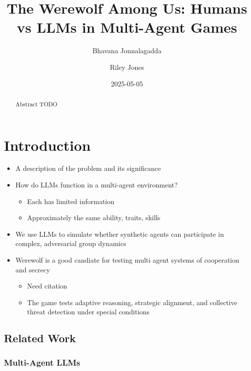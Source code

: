 \documentclass[
  letterpaper,
  DIV=11,
  numbers=noendperiod]{scrreprt}
\title{The Werewolf Among Us: Humans vs LLMs in Multi-Agent Games}
\author{Bhavana Jonnalagadda \and Riley Jones}
\date{2025-05-05}
\providecommand{\tightlist}{%
  \setlength{\itemsep}{0pt}\setlength{\parskip}{0pt}}
\renewcommand*\contentsname{Table of contents}
\newcommand\contentsname{Table of contents}
\begin{document}
\maketitle
\begin{abstract}
Abstract TODO
\end{abstract}

\renewcommand*\contentsname{Table of contents}
{
\hypersetup{linkcolor=}
\setcounter{tocdepth}{2}
\tableofcontents
}

\chapter{Introduction}\label{introduction}

\begin{itemize}
\tightlist
\item
  A description of the problem and its significance
\item
  How do LLMs function in a multi-agent environment?

  \begin{itemize}
  \tightlist
  \item
    Each has limited information
  \item
    Approximately the same ability, traits, skills
  \end{itemize}
\item
  We use LLMs to simulate whether synthetic agents can participate in
  complex, adversarial group dynamics
\item
  Werewolf is a good candiate for testing multi agent systems of
  cooperation and secrecy

  \begin{itemize}
  \tightlist
  \item
    Need citation
  \item
    The game tests adaptive reasoning, strategic alignment, and
    collective threat detection under special conditions
  \end{itemize}
\end{itemize}

\section{Related Work}\label{related-work}

\subsection{Multi-Agent LLMs}\label{multi-agent-llms}
\end{document}
